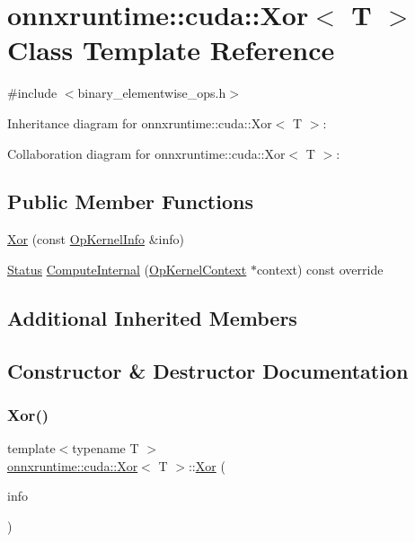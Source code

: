 \hypertarget{classonnxruntime_1_1cuda_1_1Xor}{}\section{onnxruntime\+:\+:cuda\+:\+:Xor$<$ T $>$ Class Template Reference}
\label{classonnxruntime_1_1cuda_1_1Xor}


{\ttfamily \#include $<$binary\+\_\+elementwise\+\_\+ops.\+h$>$}



Inheritance diagram for onnxruntime\+:\+:cuda\+:\+:Xor$<$ T $>$\+:


Collaboration diagram for onnxruntime\+:\+:cuda\+:\+:Xor$<$ T $>$\+:
\subsection*{Public Member Functions}
\begin{DoxyCompactItemize}
\item 
\mbox{\hyperlink{classonnxruntime_1_1cuda_1_1Xor_a416bbdc40e32911c3a6483ceadfbcdb9}{Xor}} (const \mbox{\hyperlink{classonnxruntime_1_1OpKernelInfo}{Op\+Kernel\+Info}} \&info)
\item 
\mbox{\hyperlink{classonnxruntime_1_1common_1_1Status}{Status}} \mbox{\hyperlink{classonnxruntime_1_1cuda_1_1Xor_ab631fd2ac34805590ed062a4dfea8bdc}{Compute\+Internal}} (\mbox{\hyperlink{classonnxruntime_1_1OpKernelContext}{Op\+Kernel\+Context}} $\ast$context) const override
\end{DoxyCompactItemize}
\subsection*{Additional Inherited Members}


\subsection{Constructor \& Destructor Documentation}
\mbox{\label{classonnxruntime_1_1cuda_1_1Xor_a416bbdc40e32911c3a6483ceadfbcdb9}} 
\subsubsection{\texorpdfstring{Xor()}{Xor()}}
{\footnotesize\ttfamily template$<$typename T $>$ \\
\mbox{\hyperlink{classonnxruntime_1_1cuda_1_1Xor}{onnxruntime\+::cuda\+::\+Xor}}$<$ T $>$\+::\mbox{\hyperlink{classonnxruntime_1_1cuda_1_1Xor}{Xor}} (\begin{DoxyParamCaption}\item[{const \mbox{\hyperlink{classonnxruntime_1_1OpKernelInfo}{Op\+Kernel\+Info}} \&}]{info }\end{DoxyParamCaption})\hspace{0.3cm}{\ttfamily [inline]}}



